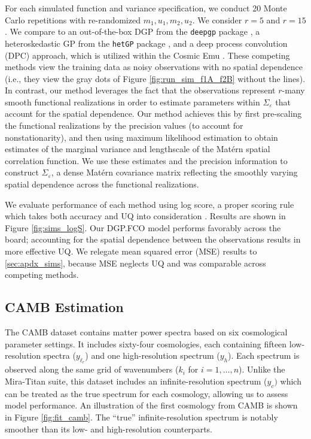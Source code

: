 \documentclass[11pt]{article}
\begin{document}
For each simulated function and variance specification, we conduct 20 Monte Carlo repetitions
with re-randomized $m_1, u_1, m_2, u_2$.  We consider $r = 5$ and $r = 15$.
We compare to an out-of-the-box DGP from the 
\texttt{deepgp} package \citep{sauer2023active}, a heteroskedastic GP from
the \texttt{hetGP} package \citep{binois2018practical, binois2021hetgp}, and
a deep process convolution (DPC) approach, which is utilized within the Cosmic 
Emu \citep{moran2023mira}.  These competing methods view the training data as 
noisy observations with no spatial dependence (i.e., they view the gray dots of
Figure \ref{fig:run_sim_f1A_f2B} without the lines). In
contrast, our method leverages the fact that the observations represent $r$-many
smooth functional realizations in order to estimate parameters
within $\Sigma_\varepsilon$ that account for the spatial dependence.
Our method achieves this by first pre-scaling the functional realizations by the
precision values (to account for nonstationarity), and then using maximum likelihood
estimation to obtain estimates of the marginal variance and lengthscale of the 
Mat\'ern spatial correlation function. We use these estimates and the precision 
information to construct $\Sigma_\varepsilon$, a dense Matérn covariance matrix 
reflecting the smoothly varying spatial dependence across the functional realizations.

We evaluate performance of each method using log score, a proper scoring 
rule which takes both accuracy and UQ into 
consideration \citep[][lower is better]{gneiting2007strictly}.
Results are shown in Figure \ref{fig:sims_logS}.  Our DGP.FCO 
model performs favorably across the board; accounting for the spatial 
dependence between the observations results in more effective UQ.
We relegate mean squared error (MSE) results to \ref{sec:apdx_sims}, because
MSE neglects UQ and was comparable across competing methods.

\subsection{CAMB Estimation}
\label{subsec:camb}

The CAMB \citep{lewis2011CAMB} dataset contains matter power spectra based
on six cosmological parameter settings. It includes sixty-four cosmologies,
each containing fifteen low-resolution spectra ($y_{\ell_r}$) and one high-resolution spectrum ($y_h$).
Each spectrum is observed along the same grid of wavenumbers ($k_i$ for $i=1,\dots,n$). 
Unlike the Mira-Titan suite, this dataset includes an infinite-resolution 
spectrum ($y_c)$ which can be treated as the true spectrum for each cosmology,
allowing us to assess model performance. An illustration of the first cosmology 
from CAMB is shown in Figure \ref{fig:fit_camb}.  The ``true'' infinite-resolution 
spectrum is notably smoother than its low- and high-resolution counterparts.
\end{document}
